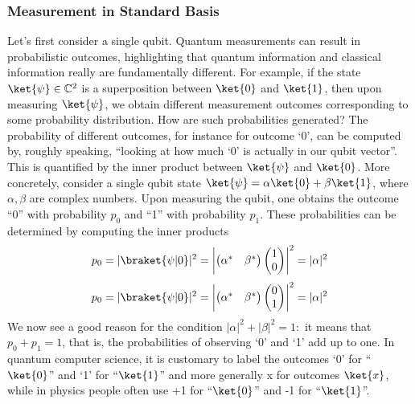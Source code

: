\documentclass[12pt, oneside]{book}
\theoremstyle{definition}
\theoremstyle{definition}
\theoremstyle{remark}
\begin{document}
\subsubsection{Measurement in Standard Basis}
Let’s first consider a single qubit. Quantum measurements can result in probabilistic outcomes,
highlighting that quantum information and classical information really are fundamentally different.
For example, if the state $\ket{\psi} \in \mathbb{C}^2$ is a superposition between $\ket{0}$ and $\ket{1}$, then upon measuring $\ket{\psi}$, we obtain different measurement outcomes corresponding to some probability distribution. How are such probabilities generated? The probability of different outcomes, for instance for outcome ‘0’, can be computed by, roughly speaking, “looking at how much ‘0’ is actually in our qubit vector”. This is quantified by the inner product between $\ket{\psi}$ and $\ket{0}$. More concretely, consider a single
qubit state $\ket{\psi}=\alpha\ket{0}+\beta\ket{1}$, where $\alpha,\beta$ are complex numbers. Upon measuring the qubit, one obtains the outcome “0” with probability $p_0$ and “1” with probability $p_1$. These probabilities can
be determined by computing the inner products
\[
p_0=|\braket{\psi|0}|^2=\begin{vmatrix} \begin{pmatrix}\alpha^* & \beta^* \end{pmatrix} \begin{pmatrix} 1 \\ 0 \end{pmatrix} \end{vmatrix}^2=|\alpha|^2
\]
\[
p_0=|\braket{\psi|0}|^2=\begin{vmatrix} \begin{pmatrix}\alpha^* & \beta^* \end{pmatrix} \begin{pmatrix} 0 \\ 1 \end{pmatrix} \end{vmatrix}^2=|\alpha|^2
\]
We now see a good reason for the condition $|\alpha|^2+|\beta|^2=1:$ it means that $p_0 + p_1 = 1$, that is, the
probabilities of observing ‘0’ and ‘1’ add up to one. In quantum computer science, it is customary
to label the outcomes ‘0’ for “$\ket{0}$” and ‘1’ for “$\ket{1}$” and more generally x for outcomes $\ket{x}$, while in physics people often use +1 for “$\ket{0}$” and -1 for “$\ket{1}$”.
\end{document}
